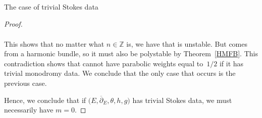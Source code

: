 \begin{subsubsection}{The case of trivial Stokes data}
\begin{proof}
\begin{itemize}
\begin{gather*}
\end{gather*}
This shows that no matter what $n\in \mathbb{Z}$ is, we have that  is unstable. But  comes from a harmonic bundle, so it must also be polystable by Theorem~\ref{HMFB}. This contradiction shows that  cannot have parabolic weights equal to~$1/2$ if it has trivial monodromy data. We conclude that the only case that occurs is the previous case.
\end{itemize}

Hence, we conclude that if $\bigl(E,\overline{\partial}_E,\theta,h,g\bigr)$ has trivial Stokes data, we must necessarily have $m=0$.
\end{proof}

\end{subsubsection}


